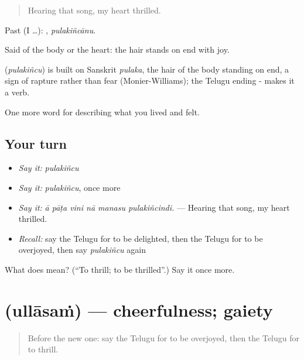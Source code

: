 \begin{quote}
Hearing that song, my heart thrilled.
\end{quote}

Past (I …): , \emph{pulakiñcānu}.

Said of the body or the heart: the hair stands on end with joy.

\begin{cousinweb}
\textbf{} (\emph{pulakiñcu}) is built on Sanskrit \emph{pulaka}, the hair of the body standing on end, a sign of rapture rather than fear (Monier-Williams); the Telugu ending - makes it a verb.
\end{cousinweb}

\begin{grammarlens}[title={What you've built}]
One more word for describing what you lived and felt.
\end{grammarlens}

\subsection*{Your turn}
\begin{itemize}
\raggedright
  \item \emph{Say it:} \emph{pulakiñcu}
  \item \emph{Say it:} \emph{pulakiñcu}, once more
  \item \emph{Say it:} \emph{ā pāṭa vini nā manasu pulakiñcindi.} — Hearing that song, my heart thrilled.
  \item \emph{Recall:} say the Telugu for to be delighted, then the Telugu for to be overjoyed, then say \emph{pulakiñcu} again
\end{itemize}

\begin{tcolorbox}[breakable,colback=teal!4,colframe=teal!35!black,title={Before you move on}]
What does  mean? (\textquotedblleft{}To thrill; to be thrilled\textquotedblright{}.) Say it once more.
\end{tcolorbox}
\section[\texorpdfstring{\te{ఉల్లాసం} (ullāsaṁ)}{ఉల్లాసం (ullāsaṁ)}]{ (ullāsaṁ) — cheerfulness; gaiety}

\label{lesson:TE-C500-ullasam}



\begin{quote}
Before the new one: say the Telugu for to be overjoyed, then the Telugu for to thrill.
\end{quote}

